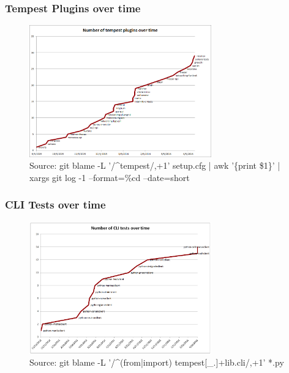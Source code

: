 \documentclass[aspectratio=169,11pt,hyperref={colorlinks=true}]{beamer}
\begin{document}
\begin{frame}
    \frametitle{Tempest Plugins over time}
    \begin{figure}[p]
    	\centering
    	\includegraphics[width=0.7\textwidth]{tempest-plugins.png}
        \caption{Source: git blame -L '/\^{}tempest/,+1' setup.cfg | awk '\{print \$1\}' | xargs git log -1 --format=\%cd --date=short}
    \end{figure}
\end{frame}

\begin{frame}
    \frametitle{CLI Tests over time}
    \begin{figure}[p]
    	\centering
    	\includegraphics[width=0.7\textwidth]{cli-tests.png}
        \caption{Source: git blame -L '/\^{}(from|import) tempest[\_.]+lib.cli/,+1' *.py}
    \end{figure}
\end{frame}
\end{document}
